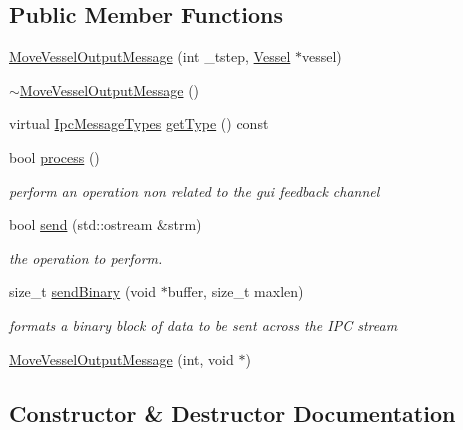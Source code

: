 \subsection*{Public Member Functions}
\begin{DoxyCompactItemize}
\item 
\mbox{\hyperlink{class_move_vessel_output_message_a2d82ff24b0af69ee48e123c5594a777e}{Move\+Vessel\+Output\+Message}} (int \+\_\+tstep, \mbox{\hyperlink{class_vessel}{Vessel}} $\ast$vessel)
\item 
\mbox{\hyperlink{class_move_vessel_output_message_aa2aa361694266bb4cd12f8d1d39eba3b}{$\sim$\+Move\+Vessel\+Output\+Message}} ()
\item 
virtual \mbox{\hyperlink{ipcmsgtypes_8h_a59f75a61492e64aebfae0cc49cc26683}{Ipc\+Message\+Types}} \mbox{\hyperlink{class_move_vessel_output_message_a8f31dbcf29eb889a5217abc82f501b4d}{get\+Type}} () const
\item 
bool \mbox{\hyperlink{class_move_vessel_output_message_ab503e94c98c0a66470a283cbf5b29c78}{process}} ()
\begin{DoxyCompactList}\small\item\em perform an operation non related to the gui feedback channel \end{DoxyCompactList}\item 
bool \mbox{\hyperlink{class_move_vessel_output_message_a3b538a1080de230361cb875d7617c947}{send}} (std\+::ostream \&strm)
\begin{DoxyCompactList}\small\item\em the operation to perform. \end{DoxyCompactList}\item 
size\+\_\+t \mbox{\hyperlink{class_move_vessel_output_message_adad3c956721e3470a6b8e5a35e8aac86}{send\+Binary}} (void $\ast$buffer, size\+\_\+t maxlen)
\begin{DoxyCompactList}\small\item\em formats a binary block of data to be sent across the I\+PC stream \end{DoxyCompactList}\item 
\mbox{\hyperlink{class_move_vessel_output_message_a715eec2c37304fa9c2a416826804cd4b}{Move\+Vessel\+Output\+Message}} (int, void $\ast$)
\end{DoxyCompactItemize}


\subsection{Constructor \& Destructor Documentation}
\mbox{\label{class_move_vessel_output_message_a2d82ff24b0af69ee48e123c5594a777e}} 
